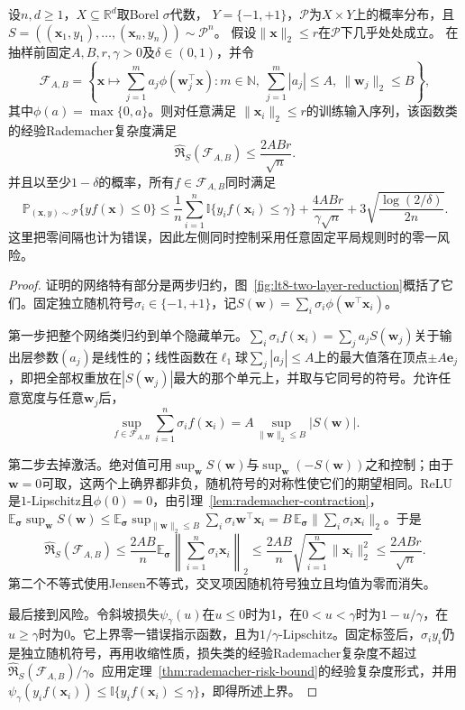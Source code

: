 \begin{theorem}[两层网络的范数与期望风险]
\label{thm:two-layer-norm-risk}
设$n,d\geq1$，$X\subseteq\mathbb R^d$取Borel $\sigma$代数，
$Y=\{-1,+1\}$，$\mathcal P$为$X\times Y$上的概率分布，且
$S=((\bm x_1,y_1),\ldots,(\bm x_n,y_n))\sim\mathcal P^n$。
假设$\|\bm x\|_2\leq r$在$\mathcal P$下几乎处处成立。
在抽样前固定$A,B,r,\gamma>0$及$\delta\in(0,1)$，并令
\[
 \mathcal F_{A,B}=\left\{\bm x\mapsto\sum_{j=1}^m a_j\phi(\bm w_j^\top\bm x):
 m\in\mathbb N,\ \sum_{j=1}^m|a_j|\leq A,\ \|\bm w_j\|_2\leq B\right\},
\]
其中$\phi(a)=\max\{0,a\}$。则对任意满足
$\|\bm x_i\|_2\leq r$的训练输入序列，该函数类的经验Rademacher复杂度满足
\[
 \widehat{\mathfrak R}_S(\mathcal F_{A,B})\leq\frac{2ABr}{\sqrt n}.
\]
并且以至少$1-\delta$的概率，所有$f\in\mathcal F_{A,B}$同时满足
\begin{equation}
 \mathbb P_{(\bm x,y)\sim\mathcal P}\{yf(\bm x)\leq0\}
 \leq\frac1n\sum_{i=1}^n\mathbb I\{y_i f(\bm x_i)\leq\gamma\}
 +\frac{4ABr}{\gamma\sqrt n}
 +3\sqrt{\frac{\log(2/\delta)}{2n}}.
 \label{eq:two-layer-margin-bound}
\end{equation}
这里把零间隔也计为错误，因此左侧同时控制采用任意固定平局规则时的零一风险。
\end{theorem}
\begin{proof}
证明的网络特有部分是两步归约，图~\ref{fig:lt8-two-layer-reduction}概括了它们。固定独立随机符号$\sigma_i\in\{-1,+1\}$，记$S(\bm w)=\sum_i\sigma_i\phi(\bm w^\top\bm x_i)$。

第一步把整个网络类归约到单个隐藏单元。$\sum_i\sigma_if(\bm x_i)=\sum_ja_jS(\bm w_j)$关于输出层参数$(a_j)$是线性的；线性函数在$\ell_1$球$\sum_j|a_j|\leq A$上的最大值落在顶点$\pm A\bm e_j$，即把全部权重放在$|S(\bm w_j)|$最大的那个单元上，并取与它同号的符号。允许任意宽度与任意$\bm w_j$后，
\[
 \sup_{f\in\mathcal F_{A,B}}\sum_{i=1}^n\sigma_i f(\bm x_i)
 =A\sup_{\|\bm w\|_2\leq B}|S(\bm w)|.
\]

第二步去掉激活。绝对值可用$\sup_{\bm w}S(\bm w)$与$\sup_{\bm w}(-S(\bm w))$之和控制；由于$\bm w=0$可取，这两个上确界都非负，随机符号的对称性使它们的期望相同。ReLU是$1$-Lipschitz且$\phi(0)=0$，由引理~\ref{lem:rademacher-contraction}，
$\mathbb E_{\bm\sigma}\sup_{\bm w}S(\bm w)\leq\mathbb E_{\bm\sigma}\sup_{\|\bm w\|_2\leq B}\sum_i\sigma_i\bm w^\top\bm x_i=B\,\mathbb E_{\bm\sigma}\|\sum_i\sigma_i\bm x_i\|_2$。于是
\[
 \widehat{\mathfrak R}_S(\mathcal F_{A,B})
 \leq\frac{2AB}{n}\mathbb E_{\bm\sigma}
       \left\|\sum_{i=1}^n\sigma_i\bm x_i\right\|_2
 \leq\frac{2AB}{n}\sqrt{\sum_{i=1}^n\|\bm x_i\|_2^2}
 \leq\frac{2ABr}{\sqrt n}.
\]
第二个不等式使用Jensen不等式，交叉项因随机符号独立且均值为零而消失。

最后接到风险。令斜坡损失$\psi_\gamma(u)$在$u\leq0$时为1，在$0<u<\gamma$时为$1-u/\gamma$，在$u\geq\gamma$时为0。它上界零一错误指示函数，且为$1/\gamma$-Lipschitz。固定标签后，$\sigma_iy_i$仍是独立随机符号，再用收缩性质，损失类的经验Rademacher复杂度不超过$\widehat{\mathfrak R}_S(\mathcal F_{A,B})/\gamma$。应用定理~\ref{thm:rademacher-risk-bound}的经验复杂度形式，并用$\psi_\gamma(y_if(\bm x_i))\leq\mathbb I\{y_if(\bm x_i)\leq\gamma\}$，即得所述上界。
\end{proof}

